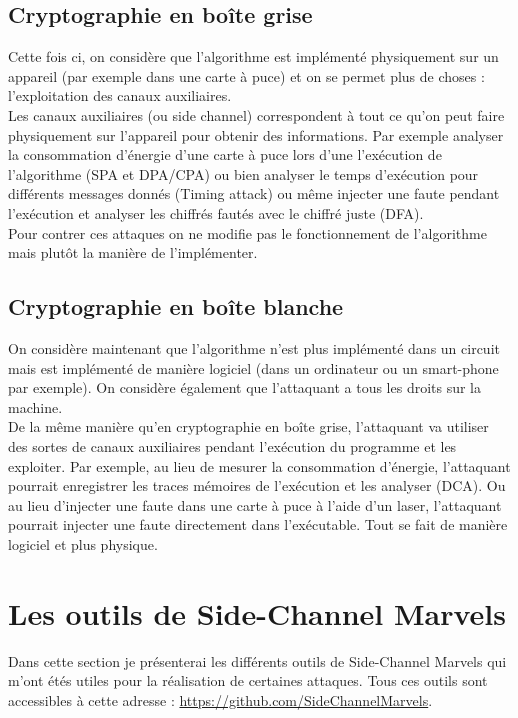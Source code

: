 \documentclass[10pt,a4paper]{article}
\begin{document}
\subsection{Cryptographie en boîte grise}
Cette fois ci, on considère que l'algorithme est implémenté physiquement sur un appareil (par exemple dans une carte à puce) et on se permet plus de choses : l'exploitation des canaux auxiliaires.
\\
Les canaux auxiliaires (ou side channel) correspondent à tout ce qu'on peut faire physiquement sur l'appareil pour obtenir des informations. Par exemple analyser la consommation d'énergie d'une carte à puce lors d'une l'exécution de l'algorithme (SPA et DPA/CPA) ou bien analyser le temps d'exécution pour différents messages donnés (Timing attack) ou même injecter une faute pendant l'exécution et analyser les chiffrés fautés avec le chiffré juste (DFA).
\\
Pour contrer ces attaques on ne modifie pas le fonctionnement de l'algorithme mais plutôt la manière de l'implémenter.

\subsection{Cryptographie en boîte blanche}
On considère maintenant que l'algorithme n'est plus implémenté dans un circuit mais est implémenté de manière logiciel (dans un ordinateur ou un smart-phone par exemple). On considère également que l'attaquant a tous les droits sur la machine.
\\
De la même manière qu'en cryptographie en boîte grise, l'attaquant va utiliser des sortes de canaux auxiliaires pendant l'exécution du programme et les exploiter. Par exemple, au lieu de mesurer la consommation d'énergie, l'attaquant pourrait enregistrer les traces mémoires de l'exécution et les analyser (DCA). Ou au lieu d'injecter une faute dans une carte à puce à l'aide d'un laser, l'attaquant pourrait injecter une faute directement dans l'exécutable. Tout se fait de manière logiciel et plus physique.

\section{Les outils de Side-Channel Marvels}
Dans cette section je présenterai les différents outils de Side-Channel Marvels qui m'ont étés utiles pour la réalisation de certaines attaques. Tous ces outils sont accessibles à cette adresse : \href{https://github.com/SideChannelMarvels}{https://github.com/SideChannelMarvels}.
\end{document}
